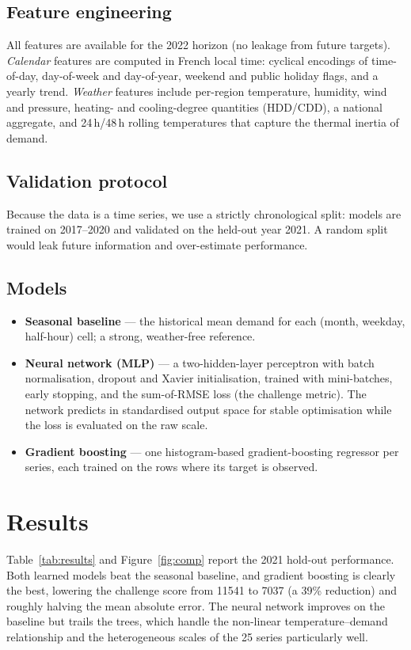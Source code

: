 \documentclass[11pt,a4paper]{article}
\begin{document}
\subsection{Feature engineering}
All features are available for the 2022 horizon (no leakage from future
targets). \emph{Calendar} features are computed in French local time: cyclical
encodings of time-of-day, day-of-week and day-of-year, weekend and public
holiday flags, and a yearly trend. \emph{Weather} features include per-region
temperature, humidity, wind and pressure, heating- and cooling-degree
quantities (HDD/CDD), a national aggregate, and 24\,h/48\,h rolling
temperatures that capture the thermal inertia of demand.

\subsection{Validation protocol}
Because the data is a time series, we use a strictly chronological split:
models are trained on 2017--2020 and validated on the held-out year 2021. A
random split would leak future information and over-estimate performance.

\subsection{Models}
\begin{itemize}
  \item \textbf{Seasonal baseline} --- the historical mean demand for each
        (month, weekday, half-hour) cell; a strong, weather-free reference.
  \item \textbf{Neural network (MLP)} --- a two-hidden-layer perceptron with
        batch normalisation, dropout and Xavier initialisation, trained with
        mini-batches, early stopping, and the sum-of-RMSE loss (the challenge
        metric). The network predicts in standardised output space for stable
        optimisation while the loss is evaluated on the raw scale.
  \item \textbf{Gradient boosting} --- one histogram-based gradient-boosting
        regressor per series, each trained on the rows where its target is
        observed.
\end{itemize}

\section{Results}
Table~\ref{tab:results} and Figure~\ref{fig:comp} report the 2021 hold-out
performance. Both learned models beat the seasonal baseline, and gradient
boosting is clearly the best, lowering the challenge score from 11541 to 7037
(a 39\% reduction) and roughly halving the mean absolute error. The neural
network improves on the baseline but trails the trees, which handle the
non-linear temperature--demand relationship and the heterogeneous scales of
the 25 series particularly well.
\end{document}

